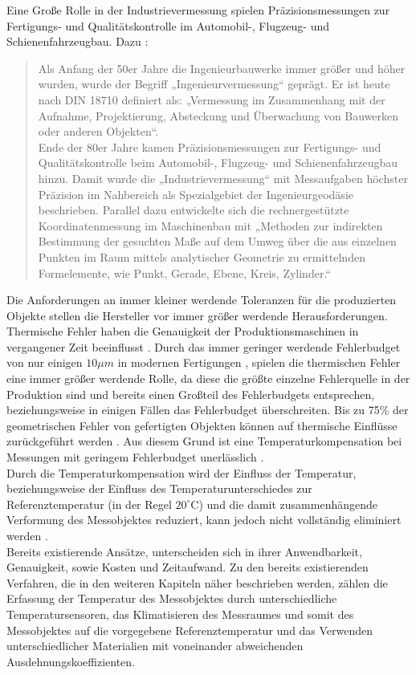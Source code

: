 Eine Große Rolle in der Industrievermessung spielen Präzisionsmessungen zur Fertigungs- und Qualitätskontrolle im Automobil-, Flugzeug- und Schienenfahrzeugbau. Dazu \cite{Moeser2007}: 
\begin{quotation}
\glqq Als Anfang der 50er Jahre die Ingenieurbauwerke immer größer und höher wurden, wurde der Begriff „Ingenieurvermessung“ geprägt. Er ist heute nach DIN 18710 definiert als: „Vermessung im Zusammenhang mit der Aufnahme, Projektierung, Absteckung und Überwachung von Bauwerken oder anderen Objekten“. \\
Ende der 80er Jahre kamen Präzisionsmessungen zur Fertigungs- und Qualitätskontrolle
beim Automobil-, Flugzeug- und Schienenfahrzeugbau hinzu. Damit wurde die „Industrievermessung“ mit Messaufgaben höchster Präzision im Nahbereich als Spezialgebiet der Ingenieurgeodäsie beschrieben. Parallel dazu entwickelte sich die rechnergestützte Koordinatenmessung im Maschinenbau mit „Methoden zur indirekten Bestimmung der gesuchten Maße auf dem Umweg über die aus einzelnen Punkten im Raum mittels analytischer Geometrie zu ermittelnden Formelemente, wie Punkt, Gerade, Ebene, Kreis, Zylinder.“\grqq
\end{quotation} 
Die Anforderungen an immer kleiner werdende Toleranzen für die produzierten Objekte stellen die Hersteller vor immer größer werdende Herausforderungen. Thermische Fehler haben die Genauigkeit der Produktionsmaschinen in vergangener Zeit beeinflusst \cite{Fletcher2005}. Durch das immer geringer werdende Fehlerbudget von nur einigen $10\mu m$ in modernen Fertigungen \cite{Ferger}, spielen die thermischen Fehler eine immer größer werdende Rolle, da diese die größte einzelne Fehlerquelle in der Produktion sind und bereits einen Großteil des Fehlerbudgets entsprechen, beziehungsweise in einigen Fällen das Fehlerbudget überschreiten. Bis zu 75\% der geometrischen Fehler von gefertigten Objekten können auf thermische Einflüsse zurückgeführt werden \cite{Mayr2012}. Aus diesem Grund ist eine Temperaturkompensation bei Messungen mit geringem Fehlerbudget unerlässlich \cite{Bryan1965}.\\
Durch die Temperaturkompensation wird der Einfluss der Temperatur, beziehungsweise der Einfluss des Temperaturunterschiedes zur Referenztemperatur (in der Regel $20^\circ\text{C} $) und die damit zusammenhängende Verformung des Messobjektes reduziert, kann jedoch nicht vollständig eliminiert werden \cite{Fletcher2005}. \\
Bereits existierende Ansätze, unterscheiden sich in ihrer Anwendbarkeit, Genauigkeit, sowie Kosten und Zeitaufwand. Zu den bereits existierenden Verfahren, die in den weiteren Kapiteln näher beschrieben werden, zählen die Erfassung der Temperatur des Messobjektes durch unterschiedliche Temperatursensoren, das Klimatisieren des Messraumes und somit des Messobjektes auf die vorgegebene Referenztemperatur und das Verwenden unterschiedlicher Materialien mit voneinander abweichenden Ausdehnungskoeffizienten.
